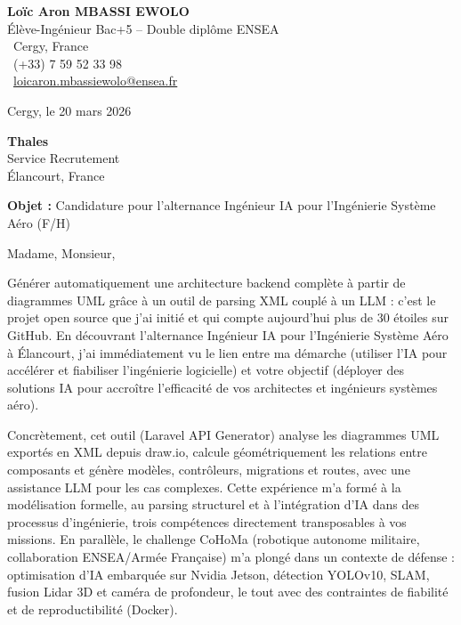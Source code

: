 \documentclass[a4paper,11pt]{article}
\begin{document}
\noindent
\begin{minipage}[t]{0.5\textwidth}
    \textbf{Loïc Aron MBASSI EWOLO}\\
    Élève-Ingénieur Bac+5 -- Double diplôme ENSEA\\[3pt]
    \faMapMarker\ Cergy, France\\
    \faPhone\ (+33) 7 59 52 33 98\\
    \faEnvelope\ \href{mailto:loicaron.mbassiewolo@ensea.fr}{loicaron.mbassiewolo@ensea.fr}
\end{minipage}
\hfill
\begin{minipage}[t]{0.4\textwidth}
    \raggedleft
    Cergy, le 20 mars 2026
\end{minipage}

\vspace{1.2cm}

\hfill
\begin{minipage}[t]{0.5\textwidth}
    \raggedleft
    \textbf{Thales}\\
    Service Recrutement\\
    Élancourt, France
\end{minipage}

\vspace{1cm}

\noindent\textbf{Objet :} Candidature pour l'alternance Ingénieur IA pour l'Ingénierie Système Aéro (F/H)

\vspace{0.8cm}

Madame, Monsieur,

Générer automatiquement une architecture backend complète à partir de diagrammes UML grâce à un outil de parsing XML couplé à un LLM : c'est le projet open source que j'ai initié et qui compte aujourd'hui plus de 30 étoiles sur GitHub. En découvrant l'alternance Ingénieur IA pour l'Ingénierie Système Aéro à Élancourt, j'ai immédiatement vu le lien entre ma démarche (utiliser l'IA pour accélérer et fiabiliser l'ingénierie logicielle) et votre objectif (déployer des solutions IA pour accroître l'efficacité de vos architectes et ingénieurs systèmes aéro).

Concrètement, cet outil (Laravel API Generator) analyse les diagrammes UML exportés en XML depuis draw.io, calcule géométriquement les relations entre composants et génère modèles, contrôleurs, migrations et routes, avec une assistance LLM pour les cas complexes. Cette expérience m'a formé à la modélisation formelle, au parsing structurel et à l'intégration d'IA dans des processus d'ingénierie, trois compétences directement transposables à vos missions. En parallèle, le challenge CoHoMa (robotique autonome militaire, collaboration ENSEA/Armée Française) m'a plongé dans un contexte de défense : optimisation d'IA embarquée sur Nvidia Jetson, détection YOLOv10, SLAM, fusion Lidar 3D et caméra de profondeur, le tout avec des contraintes de fiabilité et de reproductibilité (Docker).
\end{document}

